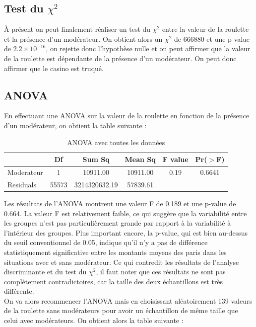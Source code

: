 \documentclass[a4paper, 12pt]{article}
\theoremstyle{exo}
\begin{document}
\subsection{Test du $\chi^2$}

À présent on peut finalement réaliser un test du $\chi^2$ entre la valeur de la roulette et la présence d'un modérateur. On obtient alors un $\chi^2$ de 666880 et une p-value de $2.2 \times 10^{-16}$, on rejette donc l'hypothèse nulle et on peut affirmer que la valeur de la roulette est dépendante de la présence d'un modérateur. On peut donc affirmer que le casino est truqué.  

\subsection{ANOVA}

En effectuant une ANOVA sur la valeur de la roulette en fonction de la présence d'un modérateur, on obtient la table suivante :

\begin{table}[H]
    \centering
    \begin{tabular}{lccccc}
      \hline
     & Df & Sum Sq & Mean Sq & F value & Pr($>$F) \\ 
      \hline
    Moderateur  & 1 & 10911.00 & 10911.00 & 0.19 & 0.6641 \\ 
      Residuals   & 55573 & 3214320632.19 & 57839.61 &  &  \\ 
       \hline
    \end{tabular}
    \caption{ANOVA avec toutes les données}
\end{table}

Les résultats de l'ANOVA montrent une valeur F de 0.189 et une p-value de 0.664. La valeur F est relativement faible, ce qui suggère que la variabilité entre les groupes n'est pas particulièrement grande par rapport à la variabilité à l'intérieur des groupes. Plus important encore, la p-value, qui est bien au-dessus du seuil conventionnel de 0.05, indique qu'il n'y a pas de différence statistiquement significative entre les montants moyens des paris dans les situations avec et sans modérateur. Ce qui contredit les résultats de l'analyse discriminante et du test du $\chi^2$, il faut noter que ces résultats ne sont pas complètement contradictoires, car la taille des deux échantillons est très différente.\\
On va alors recommencer l'ANOVA mais en choisissant aléatoirement 139 valeurs de la roulette sans modérateurs pour avoir un échantillon de même taille que celui avec modérateurs. On obtient alors la table suivante :
\end{document}
